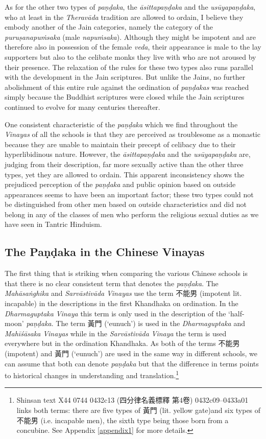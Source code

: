 As for the other two types of {\em paṇḍaka}, the {\em āsittapaṇḍaka} and the {\em usūyapaṇḍaka}, who at least in the {\em Theravāda} tradition are allowed to ordain, I believe they embody another of the Jain categories, namely the category of the {\em puruṣanapuṁsaka} (male {\em napuṁsaka}). Although they might be impotent and are therefore also in possession of the female {\em veda}, their appearance is male to the lay supporters but also to the celibate monks they live with who are not aroused by their presence. The relaxation of the rules for these two types also runs parallel with the development in the Jain scriptures. But unlike the Jains, no further abolishment of this entire rule against the ordination of {\em paṇḍakas} was reached simply because the Buddhist scriptures were closed while the Jain scriptures continued to evolve for many centuries thereafter.

One consistent characteristic of the {\em paṇḍaka} which we find throughout the {\em Vinayas} of all the schools is that they are perceived as troublesome as a monastic because they are unable to maintain their precept of celibacy due to their hyperlibidinous nature. However, the {\em āsittapaṇḍaka} and the {\em usūyapaṇḍaka} are, judging from their description, far more sexually active than the other three types, yet they are allowed to ordain. This apparent inconsistency shows the prejudiced perception of the {\em paṇḍaka} and public opinion based on outside appearances seems to have been an important factor; these two types could not be distinguished from other men based on outside characteristics and did not belong in any of the classes of men who perform the religious sexual duties as we have seen in Tantric Hinduism.

\subsection{The Paṇḍaka in the Chinese Vinayas}
The first thing that is striking when comparing the various Chinese schools is that there is no clear consistent term that denotes the {\em paṇḍaka}. The {\em Mahāsaṅghika} and {\em Sarvāstivāda} {\em Vinayas} use the term 不能男 (impotent lit. incapable) in the descriptions in the first Khandhaka on ordination. In the {\em Dharmaguptaka} {\em Vinaya} this term is only used in the description of the `half-moon' {\em paṇḍaka}. The term 黃門 (`eunuch') is used in the {\em Dharmaguptaka} and {\em Mahīśāsaka} {\em Vinayas} while in the {\em Sarvāstivāda} {\em Vinaya} the term is used everywhere but in the ordination Khandhaka. As both of the terms 不能男 (impotent) and 黃門 (`eunuch') are used in the same way in different schools, we can assume that both can denote {\em paṇḍaka} but that the difference in terms points to historical changes in understanding and translation.\footnote{Shinsan text X44 0744 0432c13 (四分律名義標釋 第4卷) 0432c09–0433a01 links both terms: there are five types of 黃門 (lit. yellow gate)and six types of 不能男 (i.e. incapable men), the sixth type being those born from a concubine. See Appendix \ref{appendix1} for more details.}

